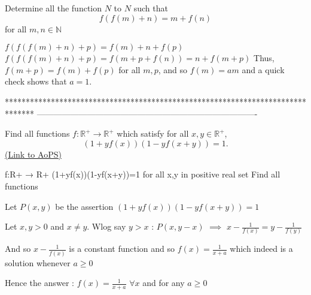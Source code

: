 \begin{solution}
	\begin{tcolorbox}Determine all the function $N$ to $N$ such that
\[f(f(m)+n)=m+f(n)\]
for all $m,n\in\mathbb{N}$\end{tcolorbox}

$f(f(f(m)+n)+p)=f(m)+n+f(p)$
$f(f(f(m)+n)+p)=f(m+p+f(n))=n+f(m+p)$
Thus, $f(m+p)=f(m)+f(p)$ for all $m,p$, and so $f(m)=am$ and a quick check shows that $a=1$.
\end{solution}
*******************************************************************************
-------------------------------------------------------------------------------

\begin{problem}
	Find all functions $f: \mathbb R^+ \to \mathbb R^+$ which satisfy for all $x, y \in \mathbb R^+$,
\[(1+yf(x))(1-yf(x+y))=1.\]
	\flushright \href{https://artofproblemsolving.com/community/c6h441866}{(Link to AoPS)}
\end{problem}



\begin{solution}
	\begin{tcolorbox}f:R+ → R+
(1+yf(x))(1-yf(x+y))=1 for all x,y in positive real set
Find all functions\end{tcolorbox}
Let $P(x,y)$ be the assertion $(1+yf(x))(1-yf(x+y))=1$

Let $x,y>0$ and $x\ne y$. Wlog say $y>x$ : $P(x,y-x)$ $\implies$ $x-\frac 1{f(x)}=y-\frac 1{f(y)}$

And so $x-\frac 1{f(x)}$ is a constant function and so $f(x)=\frac 1{x+a}$ which indeed is a solution whenever $a\ge 0$

Hence the answer : $\boxed{f(x)=\frac 1{x+a}}$ $\forall x$ and for any $a\ge 0$
\end{solution}



